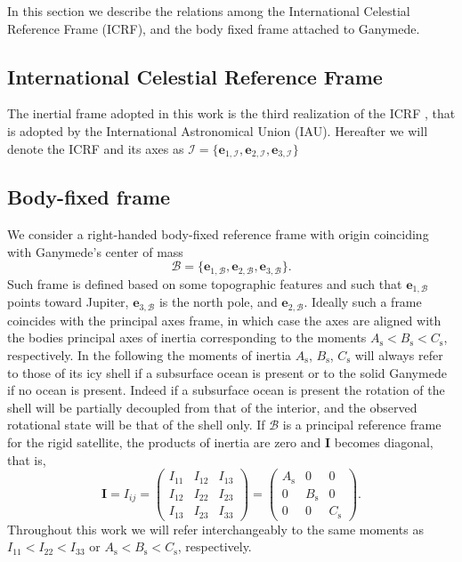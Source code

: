 \documentclass[pdflatex,sn-mathphys-num]{sn-jnl}%
\theoremstyle{thmstyleone}%
\theoremstyle{thmstyletwo}%
\theoremstyle{thmstylethree}%
\renewcommand{\vec}[1]{\boldsymbol{#1}}
\begin{document}
In this section we describe the relations among the International Celestial Reference Frame (ICRF), and the body fixed frame attached to Ganymede.

\subsection{International Celestial Reference Frame}
The inertial frame adopted in this work is the third realization of the ICRF \citep{2020A&A...644A.159C},  that is adopted by the International Astronomical Union (IAU). 
Hereafter we will denote the ICRF and its axes as ${\mathcal{I} = 
\{\vec{e}_{1,\mathcal{I}},\vec{e}_{2,\mathcal{I}},\vec{e}_{3,\mathcal{I}}\}}$

\subsection{Body-fixed frame}

We consider a right-handed body-fixed reference frame with origin coinciding with Ganymede's center of mass
\begin{equation}
{\mathcal{B} = 
\{\vec{e}_{1,\mathcal{B}},\vec{e}_{2,\mathcal{B}},\vec{e}_{3,\mathcal{B}}\}}.
\end{equation}
Such frame is defined based on some topographic features and such that $\vec{e}_{1,\mathcal{B}}$ points toward Jupiter, $\vec{e}_{3,\mathcal{B}}$ is the north pole, and $\vec{e}_{2,\mathcal{B}}$. Ideally such a frame coincides with the principal axes frame, in which case the axes are aligned with the bodies principal axes of inertia corresponding to the moments ${A_\mathrm{s} < B_\mathrm{s} < C_\mathrm{s}}$, respectively. 
In the following the moments of inertia $A_\mathrm{s}$, $B_\mathrm{s}$, $C_\mathrm{s}$ will always refer to those of its icy shell if a subsurface ocean is present or to the solid Ganymede if no ocean is present. Indeed if a subsurface ocean is present the rotation of the shell will be partially decoupled from that of the interior, and the observed rotational state will be that of the shell only.
%
If $\mathcal{B}$ is a principal reference frame for the rigid satellite, the products of inertia are zero and $\vec{I}$ becomes diagonal, that is,
%
\begin{equation}
	\vec{I} = 
	I_{ij} = 
	\begin{pmatrix}
		I_{11} & I_{12} & I_{13} \\
		I_{12} & I_{22} & I_{23} \\
		I_{13} & I_{23} & I_{33}
	\end{pmatrix}
	=
	\begin{pmatrix}
		A_\mathrm{s} & 0 & 0 \\
		0 & B_\mathrm{s} & 0 \\
		0 & 0 & C_\mathrm{s}
	\end{pmatrix}.
\end{equation}
%
Throughout this work we will refer interchangeably to the same moments as ${I_{11} < I_{22} < I_{33}}$ or ${A_\mathrm{s} < B_\mathrm{s} < C_\mathrm{s}}$, respectively.
\end{document}
